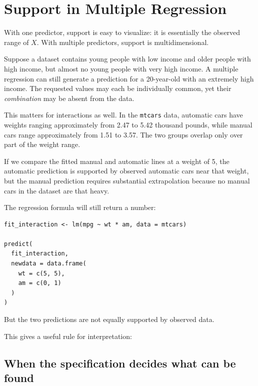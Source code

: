 \documentclass[11pt]{report}
\begin{document}
\section{Support in Multiple Regression}

With one predictor, support is easy to visualize: it is essentially the observed range of \(X\). With multiple predictors, support is multidimensional.

Suppose a dataset contains young people with low income and older people with high income, but almost no young people with very high income. A multiple regression can still generate a prediction for a 20-year-old with an extremely high income. The requested values may each be individually common, yet their \emph{combination} may be absent from the data.

This matters for interactions as well. In the \texttt{mtcars} data, automatic cars have weights ranging approximately from 2.47 to 5.42 thousand pounds, while manual cars range approximately from 1.51 to 3.57. The two groups overlap only over part of the weight range.

If we compare the fitted manual and automatic lines at a weight of 5, the automatic prediction is supported by observed automatic cars near that weight, but the manual prediction requires substantial extrapolation because no manual cars in the dataset are that heavy.

The regression formula will still return a number:

\begin{lstlisting}
fit_interaction <- lm(mpg ~ wt * am, data = mtcars)

predict(
  fit_interaction,
  newdata = data.frame(
    wt = c(5, 5),
    am = c(0, 1)
  )
)
\end{lstlisting}

But the two predictions are not equally supported by observed data.

This gives a useful rule for interpretation:

\begin{center}
\end{center}

\subsection{When the specification decides what can be found}
\end{document}
